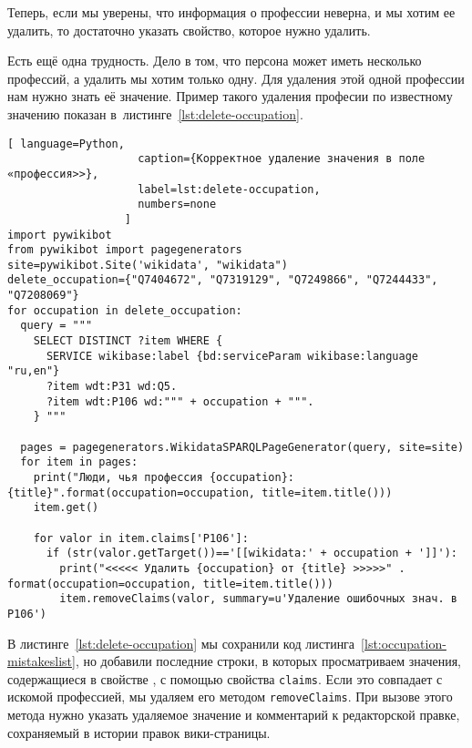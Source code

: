 Теперь, если мы уверены, что информация о профессии неверна, и мы хотим ее удалить, то достаточно указать свойство, которое нужно удалить.

Есть ещё одна трудность. 
Дело в том, что персона может иметь несколько профессий, а удалить мы хотим только одну. 
Для удаления этой одной профессии нам нужно знать её значение. 
Пример такого удаления професии по известному значению 
показан в~листинге~\ref{lst:delete-occupation}. 



\newpage
\begin{lstlisting}[ language=Python,
                    caption={Корректное удаление значения в поле «профессия>>},
                    label=lst:delete-occupation, 
                    numbers=none
                  ]
import pywikibot
from pywikibot import pagegenerators
site=pywikibot.Site('wikidata', "wikidata")
delete_occupation={"Q7404672", "Q7319129", "Q7249866", "Q7244433", 
"Q7208069"}
for occupation in delete_occupation:
  query = """
    SELECT DISTINCT ?item WHERE {
      SERVICE wikibase:label {bd:serviceParam wikibase:language "ru,en"}
      ?item wdt:P31 wd:Q5.
      ?item wdt:P106 wd:""" + occupation + """.
    } """

  pages = pagegenerators.WikidataSPARQLPageGenerator(query, site=site)
  for item in pages:
    print("Люди, чья профессия {occupation}: {title}".format(occupation=occupation, title=item.title()))
    item.get()

    for valor in item.claims['P106']:
      if (str(valor.getTarget())=='[[wikidata:' + occupation + ']]'):
        print("<<<<< Удалить {occupation} от {title} >>>>>" . format(occupation=occupation, title=item.title()))
        item.removeClaims(valor, summary=u'Удаление ошибочных знач. в P106')
\end{lstlisting} 


В листинге~\ref{lst:delete-occupation} 
мы сохранили код листинга~\ref{lst:occupation-mistakeslist}, 
но добавили последние строки, 
в которых просматриваем значения, содержащиеся в свойстве , 
с помощью свойства \lstinline|claims|. 
Если это совпадает с искомой профессией, мы удаляем его методом \lstinline|removeClaims|. 
При вызове этого метода нужно указать удаляемое значение и комментарий к редакторской правке, сохраняемый в истории правок вики-страницы.


